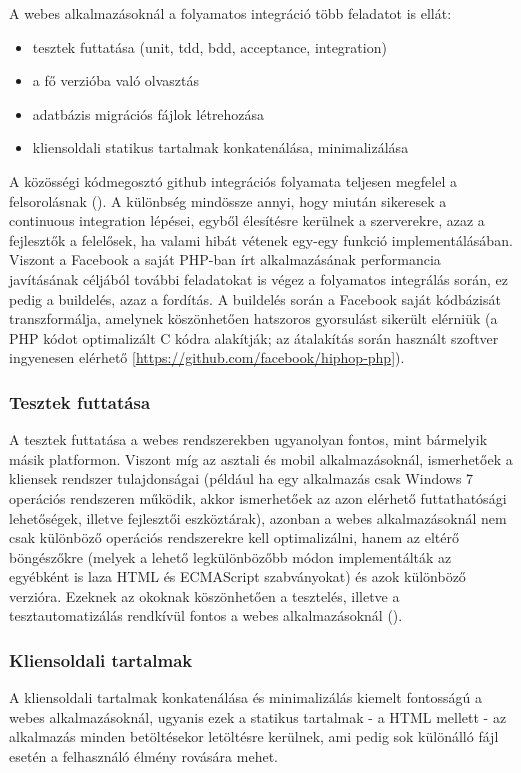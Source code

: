 A webes alkalmazásoknál a folyamatos integráció több feladatot is ellát:
\begin{itemize}
	\item tesztek futtatása (unit, tdd, bdd, acceptance, integration)
	\item a fő verzióba való olvasztás
	\item adatbázis migrációs fájlok létrehozása
	\item kliensoldali statikus tartalmak konkatenálása, minimalizálása
\end{itemize}

A közösségi kódmegosztó github integrációs folyamata teljesen megfelel a felsorolásnak (\cite{github_deployment_web}). A különbség mindössze annyi, hogy miután sikeresek a continuous integration lépései, egyből élesítésre kerülnek a szerverekre, azaz a fejlesztők a felelősek, ha valami hibát vétenek egy-egy funkció implementálásában.
\hfill\\
Viszont a Facebook a saját PHP-ban írt alkalmazásának performancia javításának céljából további feladatokat is végez a folyamatos integrálás során, ez pedig a buildelés, azaz a fordítás. A buildelés során a Facebook saját kódbázisát transzformálja, amelynek köszönhetően hatszoros gyorsulást sikerült elérniük (a PHP kódot optimalizált C kódra alakítják; az átalakítás során használt szoftver ingyenesen elérhető [\url{https://github.com/facebook/hiphop-php}]). \cite{facebook_deployment}

\subsubsection{Tesztek futtatása}
A tesztek futtatása a webes rendszerekben ugyanolyan fontos, mint bármelyik másik platformon. Viszont míg az asztali és mobil alkalmazásoknál, ismerhetőek a kliensek rendszer tulajdonságai (például ha egy alkalmazás csak Windows 7 operációs rendszeren működik, akkor ismerhetőek az azon elérhető futtathatósági lehetőségek, illetve fejlesztői eszköztárak), azonban a webes alkalmazásoknál nem csak különböző operációs rendszerekre kell optimalizálni, hanem az eltérő böngészőkre (melyek a lehető legkülönbözőbb módon implementálták az egyébként is laza HTML és ECMAScript szabványokat) és azok különböző verzióra. Ezeknek az okoknak köszönhetően a tesztelés, illetve a tesztautomatizálás rendkívül fontos a webes alkalmazásoknál (\cite{tddjs}).

\subsubsection{Kliensoldali tartalmak}
A kliensoldali tartalmak konkatenálása és minimalizálás kiemelt fontosságú a webes alkalmazásoknál, ugyanis ezek a statikus tartalmak - a HTML mellett - az alkalmazás minden betöltésekor letöltésre kerülnek, ami pedig sok különálló fájl esetén a felhasználó élmény rovására mehet.
